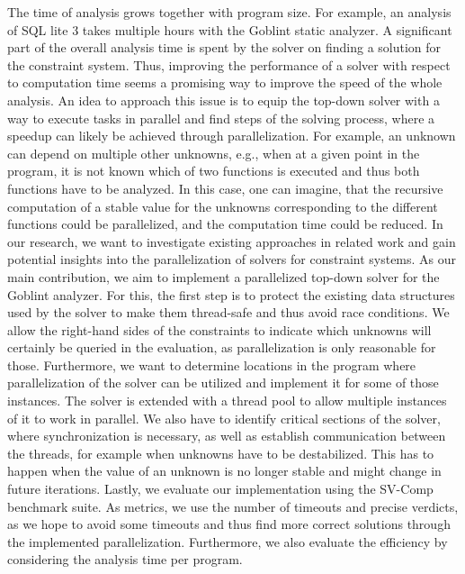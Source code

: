 The time of analysis grows together with program size. For example, an analysis of SQL lite 3 takes multiple hours with the Goblint static analyzer. A significant part of the overall analysis time is spent by the solver on finding a solution for the constraint system. Thus, improving the performance of a solver with respect to computation time seems a promising way to improve the speed of the whole analysis. An idea to approach this issue is to equip the top-down solver with a way to execute tasks in parallel and find steps of the solving process, where a speedup can likely be achieved through parallelization. For example, an unknown can depend on multiple other unknowns, e.g., when at a given point in the program, it is not known which of two functions is executed and thus both functions have to be analyzed. In this case, one can imagine, that the recursive computation of a stable value for the unknowns corresponding to the different functions could be parallelized, and the computation time could be reduced.
In our research, we want to investigate existing approaches in related work and gain potential insights into the parallelization of solvers for constraint systems.
As our main contribution, we aim to implement a parallelized top-down solver for the Goblint analyzer.
For this, the first step is to protect the existing data structures used by the solver to make them thread-safe and thus avoid race conditions. We allow the right-hand sides of the constraints to indicate which unknowns will certainly be queried in the evaluation, as parallelization is only reasonable for those. Furthermore, we want to determine locations in the program where parallelization of the solver can be utilized and implement it for some of those instances. The solver is extended with a thread pool to allow multiple instances of it to work in parallel. We also have to identify critical sections of the solver, where synchronization is necessary, as well as establish communication between the threads, for example when unknowns have to be destabilized. This has to happen when the value of an unknown is no longer stable and might change in future iterations.
Lastly, we evaluate our implementation using the SV-Comp benchmark suite. As metrics, we use the number of timeouts and precise verdicts, as we hope to avoid some timeouts and thus find more correct solutions through the implemented parallelization. Furthermore, we also evaluate the efficiency by considering the analysis time per program.
